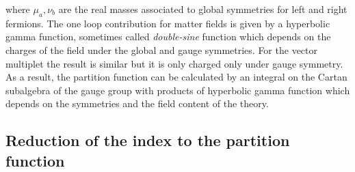 where $\mu_a,\nu_b$ are the real masses associated to global symmetries for left and right fermions. 
The one loop contribution for matter fields is given by a hyperbolic gamma function, sometimes called \emph{double-sine} function \cite{Hama:2011ea} which depends on the charges of the field under the global and gauge symmetries.
For the vector multiplet the result is similar but it is only charged only under gauge symmetry.
\\
As a result, the partition function can be calculated by an integral on the Cartan subalgebra of the gauge group with products of hyperbolic gamma function which depends on the symmetries and the field content of the theory.


\subsection{Reduction of the index to the partition function}